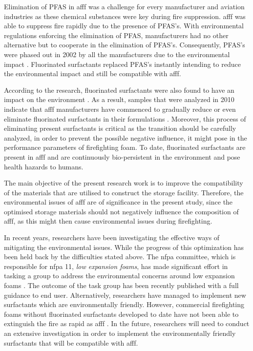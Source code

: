 Elimination of PFAS in \acrshort{afff} was a challenge for every manufacturer and aviation industries as these chemical substances were key during fire suppression. \acrshort{afff} was able to suppress fire rapidly due to the presence of PFAS's. With environmental regulations enforcing the elimination of PFAS, manufacturers had no other alternative but to cooperate in the elimination of PFAS's. Consequently, PFAS's were phased out in 2002 by all the manufacturers due to the environmental impact \cite{persson2003foamspex}.  Fluorinated surfactants replaced PFAS's instantly intending to reduce the environmental impact and still be compatible with \acrshort{afff}. 

According to the research, fluorinated surfactants were also found to have an impact on the environment \cite{martin2012fire}. As a result, samples that were analyzed in 2010 indicate that \acrshort{afff} manufacturers have commenced to gradually reduce or even eliminate fluorinated surfactants in their formulations \cite{milley2018estimating}. Moreover, this process of eliminating present surfactants is critical as the transition should be carefully analyzed, in order to prevent the possible negative influence, it might pose in the performance parameters of firefighting foam. To date, fluorinated surfactants are present in \acrshort{afff} and are continuously bio-persistent in the environment and pose health hazards to humans.

The main objective of the present research work is to improve the compatibility of the materials that are utilised to construct the storage facility. Therefore, the environmental issues of \acrshort{afff} are of significance in the present study, since the optimised storage materials should not negatively influence the composition of \acrshort{afff}, as this might then cause environmental issues during firefighting. 

In recent years, researchers have been investigating the effective ways of mitigating the environmental issues. While the progress of this optimization has been held back by the difficulties stated above. The \acrshort{nfpa} committee, which is responsible for \acrshort{nfpa} 11, \emph{low expansion foams}, has made significant effort in tasking a group to address the environmental concerns around low expansion foams \cite{scheffey1995evaluating}. The outcome of the task group has been recently published with a full guidance to end user\cite{scheffey1995evaluating}. Alternatively, researchers have managed to implement new surfactants which are environmentally friendly. However, commercial firefighting foams without fluorinated surfactants developed to date have not been able to extinguish the fire as rapid as \acrshort{afff} \cite{hinnant2017influence}. In the future, researchers will need to conduct an extensive investigation in order to implement the environmentally friendly surfactants that will be compatible with \acrshort{afff}.  

